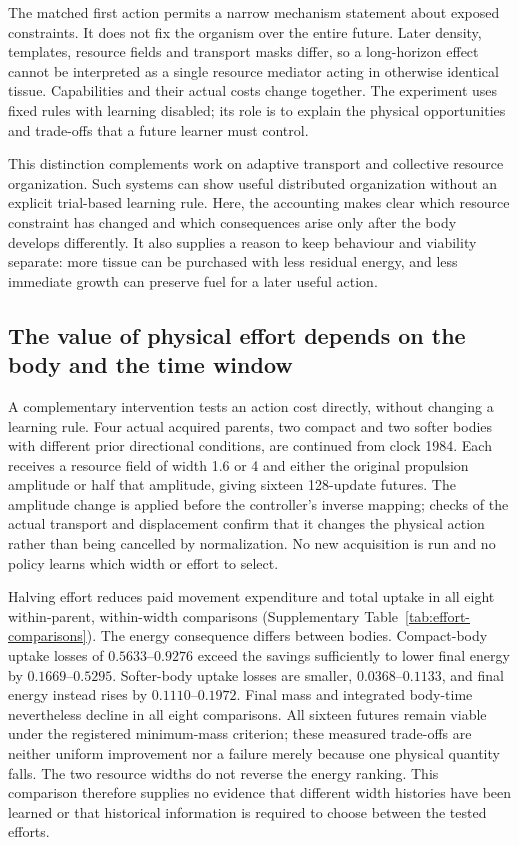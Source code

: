 The matched first action permits a narrow mechanism statement about exposed constraints. It does not fix the organism over the entire future. Later density, templates, resource fields and transport masks differ, so a long-horizon effect cannot be interpreted as a single resource mediator acting in otherwise identical tissue. Capabilities and their actual costs change together. The experiment uses fixed rules with learning disabled; its role is to explain the physical opportunities and trade-offs that a future learner must control.

This distinction complements work on adaptive transport and collective resource organization\cite{tero,teronetwork,liu,prindle}. Such systems can show useful distributed organization without an explicit trial-based learning rule. Here, the accounting makes clear which resource constraint has changed and which consequences arise only after the body develops differently. It also supplies a reason to keep behaviour and viability separate: more tissue can be purchased with less residual energy, and less immediate growth can preserve fuel for a later useful action.

\subsection*{The value of physical effort depends on the body and the time window}

A complementary intervention tests an action cost directly, without changing a learning rule. Four actual acquired parents, two compact and two softer bodies with different prior directional conditions, are continued from clock 1984. Each receives a resource field of width 1.6 or 4 and either the original propulsion amplitude or half that amplitude, giving sixteen 128-update futures. The amplitude change is applied before the controller's inverse mapping; checks of the actual transport and displacement confirm that it changes the physical action rather than being cancelled by normalization. No new acquisition is run and no policy learns which width or effort to select.

Halving effort reduces paid movement expenditure and total uptake in all eight within-parent, within-width comparisons (Supplementary Table~\ref{tab:effort-comparisons}). The energy consequence differs between bodies. Compact-body uptake losses of $0.5633$--$0.9276$ exceed the savings sufficiently to lower final energy by $0.1669$--$0.5295$. Softer-body uptake losses are smaller, $0.0368$--$0.1133$, and final energy instead rises by $0.1110$--$0.1972$. Final mass and integrated body-time nevertheless decline in all eight comparisons. All sixteen futures remain viable under the registered minimum-mass criterion; these measured trade-offs are neither uniform improvement nor a failure merely because one physical quantity falls. The two resource widths do not reverse the energy ranking. This comparison therefore supplies no evidence that different width histories have been learned or that historical information is required to choose between the tested efforts.

